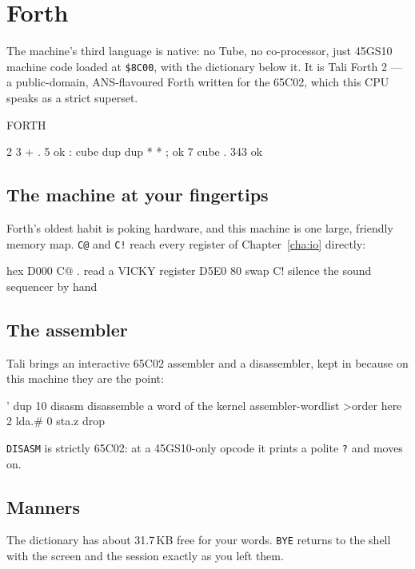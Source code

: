 \chapter{Forth}\label{cha:forth}

The machine's third language is native: no Tube, no co-processor, just
45GS10 machine code loaded at \texttt{\$8C00}, with the dictionary
below it. It is Tali Forth 2 ---
a public-domain, ANS-flavoured Forth written for the 65C02, which this
CPU speaks as a strict superset.

\begin{type}
FORTH
\end{type}

\begin{type}
2 3 + . 5  ok
: cube dup dup * * ;  ok
7 cube . 343  ok
\end{type}


\section{The machine at your fingertips}
Forth's oldest habit is poking hardware, and this machine is one large,
friendly memory map. \verb|C@| and \verb|C!| reach every register of
Chapter~\ref{cha:io} directly:

\begin{type}
hex
D000 C@ .            read a VICKY register
D5E0 80 swap C!      silence the sound sequencer by hand
\end{type}

\section{The assembler}
Tali brings an interactive 65C02 assembler and a disassembler, kept in
because on this machine they are the point:

\begin{type}
' dup 10 disasm      disassemble a word of the kernel
assembler-wordlist >order
here  2 lda.#  0 sta.z  drop
\end{type}

\verb|DISASM| is strictly 65C02: at a 45GS10-only opcode it prints a polite
\verb|?| and moves on.

\section{Manners}
The dictionary has about 31.7\,KB free for your words. \verb|BYE| returns
to the shell with the screen and the session exactly as you left them.


